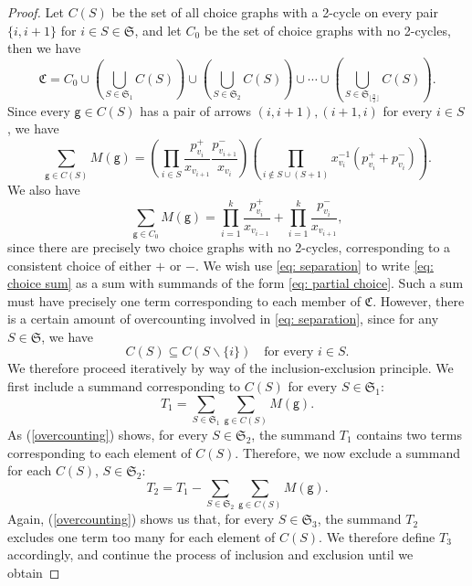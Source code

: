 \documentclass[ALCO,published]{cedram}
\numberwithin{equation}{section}
\newcommand{\1}{^{-1}}
\begin{document}
\begin{proof}
Let $C(S)$ be the set of all choice graphs with a 2-cycle on every pair $\{i,i+1\}$ for $i \in S \in \mathfrak S$, and let $C_0$ be the set of choice graphs with no 2-cycles, then we have
\begin{equation}\label{eq: separation}
\mathfrak C = C_0 \cup \left(\bigcup_{S \in \mathfrak S_1}C(S)\right) \cup \left(\bigcup_{S \in \mathfrak S_2}C(S)\right) \cup \cdots \cup \left(\bigcup_{S \in \mathfrak S_{\lfloor \frac n2 \rfloor}} C(S)\right).
\end{equation}
Since every $\mathsf g \in C(S)$ has a pair of arrows $(i,i+1), (i+1,i)$ for every $i \in S$, we have
\begin{equation}\label{eq: partial choice}
\sum_{\mathsf g \in C(S)} M(\mathsf g) = \left(\prod_{i\in S} \frac{p_{v_i}^+}{x_{v_{i+1}}}\frac{p_{v_{i+1}}^-}{x_{v_i}}\right) \left(\prod_{i \notin S \cup (S+1)} x_{v_i}\1\left(p_{v_i}^+ + p_{v_i}^-\right)\right).
\end{equation}
We also have 
\[
\sum_{\mathsf g \in C_0} M(\mathsf g) = \prod_{i=1}^k \frac{p_{v_i}^+}{x_{v_{i-1}}} + \prod_{i=1}^k \frac{p_{v_i}^-}{x_{v_{i+1}}},
\]
since there are precisely two choice graphs with no 2-cycles, corresponding to a consistent choice of either $+$ or $-$.
We wish use \eqref{eq: separation} to write \eqref{eq: choice sum} as a sum with summands of the form \eqref{eq: partial choice}. Such a sum must have precisely one term corresponding to each member of $\mathfrak C$. However, there is a certain amount of overcounting involved in \eqref{eq: separation}, since for any $S \in \mathfrak S$, we have
\begin{equation}\label{overcounting}
C(S) \subseteq C(S \smallsetminus \{i\}) \quad \text{for every } i \in S.
\end{equation}
We therefore proceed iteratively by way of the inclusion-exclusion principle. We first include a summand corresponding to $C(S)$ for every $S \in \mathfrak S_1$:
\[
T_1 = \sum_{S \in \mathfrak S_1} \sum_{\mathsf g \in C(S)} M(\mathsf g).
\]
As (\ref{overcounting}) shows, for every $S \in \mathfrak S_2$, the summand $T_1$ contains two terms corresponding to each element of $C(S)$. Therefore, we now exclude a summand for each $C(S)$, $S \in \mathfrak S_2$:
\[
T_2 = T_1 - \sum_{S \in \mathfrak S_2} \sum_{\mathsf g \in C(S)} M(\mathsf g).
\]
Again, (\ref{overcounting}) shows us that, for every $S \in \mathfrak S_3$, the summand $T_2$ excludes one term too many for each element of $C(S)$. We therefore define $T_3$ accordingly, and continue the process of inclusion and exclusion until we obtain

\end{proof}
\end{document}
